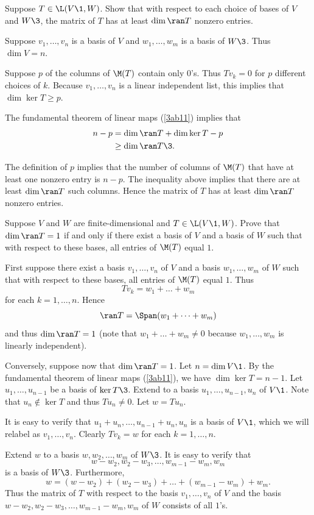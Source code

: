 
\exercise
Suppose $T \in \L(V\1, W)$. Show that with respect to each choice of bases of $V$ and $W\3$, the matrix of $T$ has at least $\dim \ran T$ nonzero entries.

\begin{Solution}
Suppose $v_1, \dots, v_n$ is a basis of $V$ and $w_1, \dots, w_m$ is a basis of $W\3$. Thus $\dim V = n$.

Suppose $p$ of the columns of $\M(T)$ contain only $0$'s. Thus $Tv_k = 0$ for $p$ different choices of $k$. Because $v_1, \dots, v_n$  is a linear independent list, this implies that $\dim \ker T \ge p $.

The fundamental theorem of linear maps (\ref{3ab11}) implies that
\begin{align*}
n - p &= \dim \ran T +  \dim \ker T - p \\
&\ge \dim \ran T\3.
\end{align*}

The definition of $p$ implies that the number of columns of $\M(T)$ that have at least one nonzero entry is $n  - p$. The inequality above implies that there are at least $\dim \ran T$ such columns. Hence the matrix of $T$ has at least $\dim \ran T$ nonzero entries.
\end{Solution}

\exercise
Suppose $V$ and $W$ are finite-dimensional and $T \in \L(V\1, W)$. Prove that $\dim \ran T = 1$ if and only if there exist a basis of $V$ and a basis of $W$ such that with respect to these bases, all entries of $\M(T)$ equal $1$.

\begin{Solution}
First suppose there exist a basis $v_1, \dots, v_n$ of $V$ and a basis $w_1, \dots, w_m$ of $W$ such that with respect to these bases, all entries of $\M(T)$ equal $1$. Thus
\[
Tv_k = w_1 + \dots + w_m
\]
for each $k = 1, \dots, n$. Hence
\[
\ran T = \Span( w_1 + \dots + w_m)
\]
and thus $\dim \ran T = 1$ (note that $w_1 + \dots + w_m \ne 0$ because $w_1, \dots, w_m$ is linearly independent).

Conversely, suppose now that $\dim \ran T = 1$. Let $n = \dim V\1$. By the fundamental theorem of linear maps (\ref{3ab11}), we have $\dim \ker T = n-1$. Let $u_1, \dots, u_{n-1}$ be a basis of $\ker T\3$. Extend to a basis
$u_1, \dots, u_{n-1}, u_n$ of $V\1$. Note that $u_n \notin \ker T$ and thus $Tu_n \ne 0$. Let $w = Tu_n$.

It is easy to verify that $u_1 + u_n, \dots, u_{n-1} + u_n, u_n$ is a basis of $V\1$, which we will relabel as $v_1, \dots, v_n$. Clearly $Tv_k = w$ for each $k = 1, \dots, n$.

Extend $w$ to a basis $w, w_2, \dots, w_m$ of $W\3$. It is easy to verify that
\[
w - w_2, w_2 - w_3, \dots, w_{m-1} - w_m, w_m
\]
is a basis of $W\3$. Furthermore,
\[
w = (w - w_2) + (w_2 - w_3) + \dots + (w_{m-1} - w_m) + w_m.
\]
Thus the matrix of $T$ with respect to the basis $v_1, \dots, v_n$ of $V$ and the basis
$w - w_2, w_2 - w_3, \dots, w_{m-1} - w_m, w_m$ of $W$ consists of all $1$'s.
\end{Solution}

